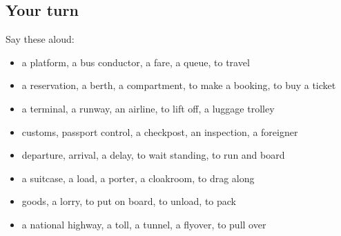 \subsection*{Your turn}
Say these aloud:

\begin{itemize}
\raggedright
  \item a platform, a bus conductor, a fare, a queue, to travel
  \item a reservation, a berth, a compartment, to make a booking, to buy a ticket
  \item a terminal, a runway, an airline, to lift off, a luggage trolley
  \item customs, passport control, a checkpost, an inspection, a foreigner
  \item departure, arrival, a delay, to wait standing, to run and board
  \item a suitcase, a load, a porter, a cloakroom, to drag along
  \item goods, a lorry, to put on board, to unload, to pack
  \item a national highway, a toll, a tunnel, a flyover, to pull over
\end{itemize}

